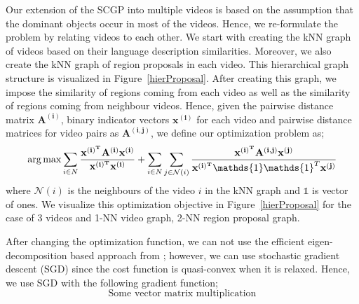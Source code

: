 Our extension of the SCGP into multiple videos is based on the assumption that the dominant objects occur in most of the videos. Hence, we re-formulate the problem by relating videos to each other. We start with creating the kNN graph of videos based on their language description similarities. Moreover, we also create the kNN graph of region proposals in each video. This hierarchical graph structure is visualized in Figure~\ref{hierProposal}. After creating this graph, we impose the similarity of regions coming from each video as well as the similarity of regions coming from neighbour videos. Hence, given the pairwise distance matrix $\mathbf{A^(i)}$, binary indicator vectors $\mathbf{x^(i)}$ for each video and pairwise distance matrices for video pairs as $\mathbf{A^{(i,j)}}$, we define our optimization problem as;
\begin{equation}
\argmax \sum_{i \in N} \frac{\mathbf{x^{(i)^T}}\mathbf{A^{(i)}}\mathbf{x^{(i)}}}{\mathbf{x^{(i)^T}}\mathbf{x^{(i)}}} +
\sum_{i \in N} \sum_{j \in \mathcal{N}(i)} \frac{\mathbf{x^{(i)^T}}\mathbf{A^{(i,j)}}\mathbf{x^{(j)}}} {\mathbf{x^{(i)^T}}\mathds{1}\mathds{1}^T\mathbf{x^{(j)}}}
\end{equation}
where $\mathcal{N}(i)$ is the neighbours of the video $i$ in the kNN graph and $\mathds{1}$ is vector of ones. We visualize this optimization objective in Figure~\ref{hierProposal} for the case of 3 videos and 1-NN video graph, 2-NN region proposal graph.

After changing the optimization function, we can not use the efficient eigen-decomposition based approach from \cite{scgp,scgp_eigen}; however, we can use stochastic gradient descent (SGD) since the cost function is quasi-convex when it is relaxed. Hence, we use SGD with the following gradient function;
\begin{equation}
  \text{Some vector matrix multiplication}
\end{equation}

